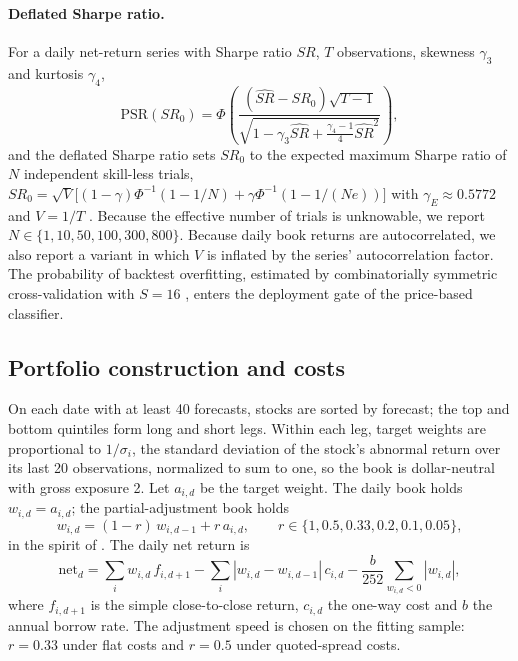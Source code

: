 \paragraph{Deflated Sharpe ratio.} For a daily net-return series with Sharpe ratio $\widehat{SR}$, $T$ observations, skewness $\gamma_3$ and kurtosis $\gamma_4$,
\begin{equation}
\mathrm{PSR}(SR_0)=\Phi\!\left(\frac{(\widehat{SR}-SR_0)\sqrt{T-1}}{\sqrt{1-\gamma_3\widehat{SR}+\frac{\gamma_4-1}{4}\widehat{SR}^2}}\right),\label{eq:psr}
\end{equation}
and the deflated Sharpe ratio sets $SR_0$ to the expected maximum Sharpe ratio of $N$ independent skill-less trials, $SR_0=\sqrt{V}\big[(1-\gamma)\Phi^{-1}(1-1/N)+\gamma\Phi^{-1}(1-1/(Ne))\big]$ with $\gamma_{E}\approx0.5772$ and $V=1/T$ \citep{bailey2014dsr}. Because the effective number of trials is unknowable, we report $N\in\{1,10,50,100,300,800\}$. Because daily book returns are autocorrelated, we also report a variant in which $V$ is inflated by the series' autocorrelation factor. The probability of backtest overfitting, estimated by combinatorially symmetric cross-validation with $S=16$ \citep{bailey2017pbo}, enters the deployment gate of the price-based classifier.

\subsection{Portfolio construction and costs}\label{sec:portfolio}

On each date with at least 40 forecasts, stocks are sorted by forecast; the top and bottom quintiles form long and short legs. Within each leg, target weights are proportional to $1/\sigma_i$, the standard deviation of the stock's abnormal return over its last 20 observations, normalized to sum to one, so the book is dollar-neutral with gross exposure 2. Let $a_{i,d}$ be the target weight. The daily book holds $w_{i,d}=a_{i,d}$; the partial-adjustment book holds
\begin{equation}
w_{i,d}=(1-r)\,w_{i,d-1}+r\,a_{i,d},\qquad r\in\{1,0.5,0.33,0.2,0.1,0.05\},\label{eq:adj}
\end{equation}
in the spirit of \citet{garleanu2013}. The daily net return is
\begin{equation}
\mathrm{net}_d=\sum_i w_{i,d}\,f_{i,d+1}-\sum_i|w_{i,d}-w_{i,d-1}|\,c_{i,d}-\frac{b}{252}\sum_{w_{i,d}<0}|w_{i,d}|,\label{eq:net}
\end{equation}
where $f_{i,d+1}$ is the simple close-to-close return, $c_{i,d}$ the one-way cost and $b$ the annual borrow rate. The adjustment speed is chosen on the fitting sample: $r=0.33$ under flat costs and $r=0.5$ under quoted-spread costs.

